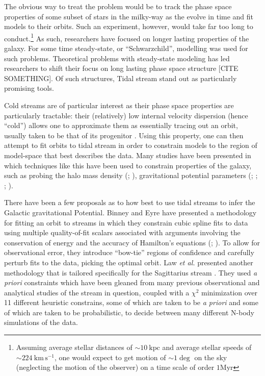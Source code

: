 \documentclass[12pt,preprint]{aastex}
\theoremstyle{plain}
\theoremstyle{definition}
\newcommand{\unit}[1]{\mathrm{#1}}
\newcommand{\kpc}{\unit{kpc}}
\newcommand{\Myr}{\unit{Myr}}
\newcommand{\km}{\unit{km}}
\newcommand{\s}{\unit{s}}
\newcommand{\kmps}{\km\,\s^{-1}}
\newcommand{\foreign}[1]{\textit{#1}}
\begin{document}
The obvious way to treat the problem would be to track the phase space properties of some subset of stars in the milky-way as the evolve in time and fit models to their orbits. Such an experiment, however, would take far too long to conduct.\footnote{Assuming average stellar distances of $\sim 10~\kpc$ and average stellar speeds of $\sim 224 ~\kmps$, one would expect to get motion of $\sim 1\deg$ on the sky (neglecting the motion of the observer)  on a time scale of order $1 \Myr$}
As such, researchers have focused on longer lasting properties of the galaxy. For some time steady-state, or ``Schwarzchild'', modelling was used for such problems. Theoretical problems with steady-state modeling has led researchers to shift their focus on long lasting phase space structure [CITE SOMETHING]. Of such structures, Tidal stream stand out as particularly promising tools.

Cold streams are of particular interest as their phase space properties are particularly tractable: their (relatively) low internal velocity dispersion (hence ``cold'') allows one to approximate them as essentially tracing out an orbit, usually taken to be that of its progenitor \citep{GD1}. Using this property, one can then attempt to fit orbits to tidal stream in order to constrain models to the region of model-space that best describes the data. Many studies have been presented in which techniques like this have been used to constrain properties of the galaxy, such as probing the halo mass density (\citet{Bell}; \citet{LMJ}), gravitational potential parameters (\citet{KRH}; \citet{LMJ}; \citet{JZSH}; \citet{Bin}). 


There have been a few proposals as to how best to use tidal streams to infer the Galactic gravitational Potential. Binney and Eyre have presented a methodology for fitting an orbit to streams in which they constrain cubic spline fits to data using multiple quality-of-fit scalars associated with arguments involving the conservation of energy  and the accuracy of Hamilton's equations (\citet{Bin}; \citet{EB}). To allow for observational error, they introduce ``bow-tie'' regions of confidence and carefully perturb fits to the data, picking the optimal orbit. Law \foreign{et al.} presented another methodology that is tailored specifically for the Sagittarius stream \citep{LMJ}. They used  \foreign{a priori} constraints which have been gleaned from many previous observational and analytical studies of the stream in question, coupled with a $\chi^2$ minimization over 11 different heuristic constrains, some of which are taken to be \foreign{a priori} and some of which are taken to be probabilistic, to decide between many different N-body simulations of the data.
\end{document}
